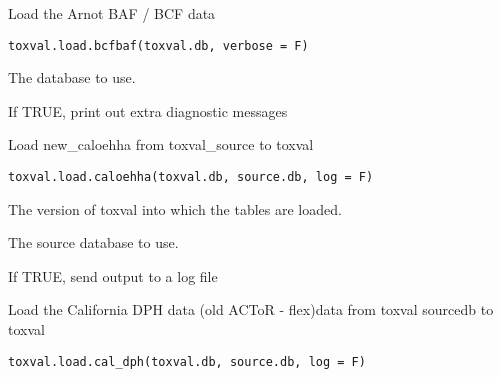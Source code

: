 \documentclass[letterpaper]{book}
\begin{document}
%
\begin{Description}\relax
Load the Arnot BAF / BCF data
\end{Description}
%
\begin{Usage}
\begin{verbatim}
toxval.load.bcfbaf(toxval.db, verbose = F)
\end{verbatim}
\end{Usage}
%
\begin{Arguments}
\begin{ldescription}
\item[\code{toxval.db}] The database to use.

\item[\code{verbose}] If TRUE, print out extra diagnostic messages
\end{ldescription}
\end{Arguments}
%
\begin{Description}\relax
Load new\_caloehha from toxval\_source to toxval
\end{Description}
%
\begin{Usage}
\begin{verbatim}
toxval.load.caloehha(toxval.db, source.db, log = F)
\end{verbatim}
\end{Usage}
%
\begin{Arguments}
\begin{ldescription}
\item[\code{toxval.db}] The version of toxval into which the tables are loaded.

\item[\code{source.db}] The source database to use.

\item[\code{log}] If TRUE, send output to a log file
\end{ldescription}
\end{Arguments}
%
\begin{Description}\relax
Load the California DPH data (old ACToR - flex)data  from toxval sourcedb to toxval
\end{Description}
%
\begin{Usage}
\begin{verbatim}
toxval.load.cal_dph(toxval.db, source.db, log = F)
\end{verbatim}
\end{Usage}
\end{document}
